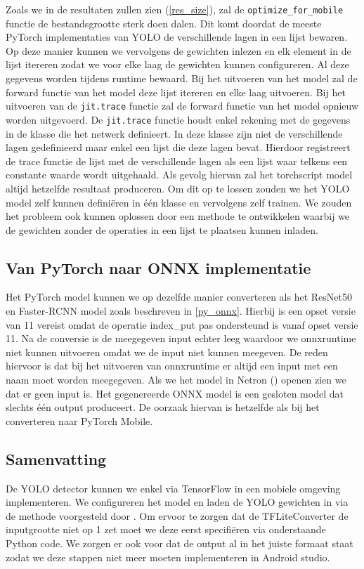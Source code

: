 Zoals we in de resultaten zullen zien (\ref{res_size}), zal de \texttt{optimize\_for\_mobile} functie de bestandsgrootte sterk doen dalen.
Dit komt doordat de meeste PyTorch implementaties van YOLO de verschillende lagen in een lijst bewaren.
Op deze manier kunnen we vervolgens de gewichten inlezen en elk element in de lijst itereren zodat we voor elke laag de gewichten kunnen configureren.
Al deze gegevens worden tijdens runtime bewaard.
Bij het uitvoeren van het model zal de forward functie van het model deze lijst itereren en elke laag uitvoeren.
Bij het uitvoeren van de \texttt{jit.trace} functie zal de forward functie van het model opnieuw worden uitgevoerd.
De \texttt{jit.trace} functie houdt enkel rekening met de gegevens in de klasse die het netwerk definieert.
In deze klasse zijn niet de verschillende lagen gedefinieerd maar enkel een lijst die deze lagen bevat.
Hierdoor registreert de trace functie de lijst met de verschillende lagen als een lijst waar telkens een constante waarde wordt uitgehaald.
Als gevolg hiervan zal het torchscript model altijd hetzelfde resultaat produceren.
Om dit op te lossen zouden we het YOLO model zelf kunnen defini\"eren in \'e\'en klasse en vervolgens zelf trainen.
We zouden het probleem ook kunnen oplossen door een methode te ontwikkelen waarbij we de gewichten  zonder de operaties in een lijst te plaatsen kunnen inladen.

\subsection{Van PyTorch naar ONNX implementatie}
Het PyTorch model kunnen we op dezelfde manier converteren als het ResNet50 en Faster-RCNN model zoals beschreven in \ref{py_onnx}.
Hierbij is een opset versie van 11 vereist omdat de operatie index\_put pas ondersteund is vanaf opset versie 11.
Na de conversie is de meegegeven input echter leeg waardoor we onnxruntime niet kunnen uitvoeren omdat we de input niet kunnen meegeven.
De reden hiervoor is dat bij het uitvoeren van onnxruntime er altijd een input met een naam moet worden meegegeven.
Als we het model in Netron (\cite{roeder_lutzroedernetron_2022}) openen zien we dat er geen input is.
Het gegenereerde ONNX model is een gesloten model dat slechts \'e\'en output produceert.
De oorzaak hiervan is hetzelfde als bij het converteren naar PyTorch Mobile.

\subsection{Samenvatting}
De YOLO detector kunnen we enkel via TensorFlow in een mobiele omgeving implementeren.
We configureren het model en laden de YOLO gewichten in via de methode voorgesteld door \cite{anh_yolo3_2021}.
Om ervoor te zorgen dat de TFLiteConverter de inputgrootte niet op 1 zet moet we deze eerst specifi\"eren via onderstaande Python code.
We zorgen er ook voor dat de output al in het juiste formaat staat zodat we deze stappen niet meer moeten implementeren in Android studio.

